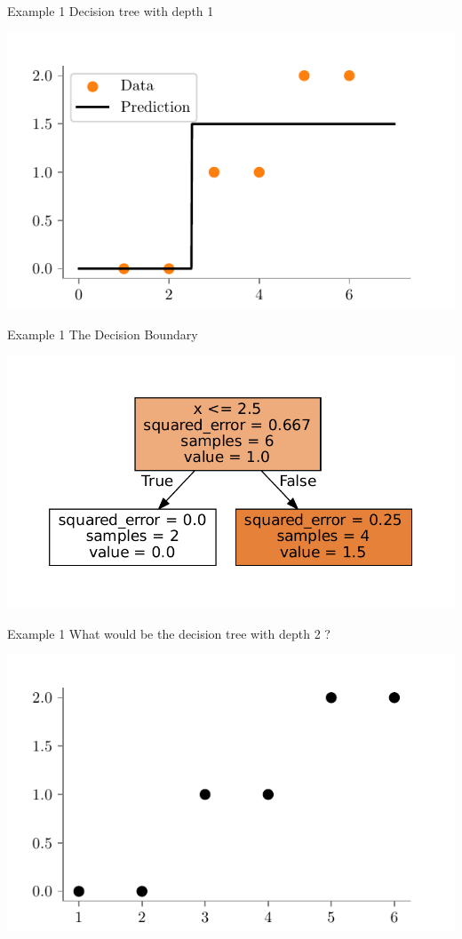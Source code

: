\documentclass{beamer}
\begin{document}
\begin{frame}{Example 1}
Decision tree with depth 1
\begin{center}
\includegraphics{../figures/decision-trees/ri-ro-depth-1.pdf}	
\end{center}
\end{frame}

\begin{frame}{Example 1}
The Decision Boundary
\begin{center}
\includegraphics[scale=0.6]{../figures/decision-trees/ri-ro-depth-1-sklearn.pdf}
\end{center}
\end{frame}


\begin{frame}{Example 1}
What would be the decision tree with depth 2	?
\begin{center}
	\includegraphics{../figures/decision-trees/ri-ro-dataset.pdf}
\end{center}
\end{frame}
\end{document}
